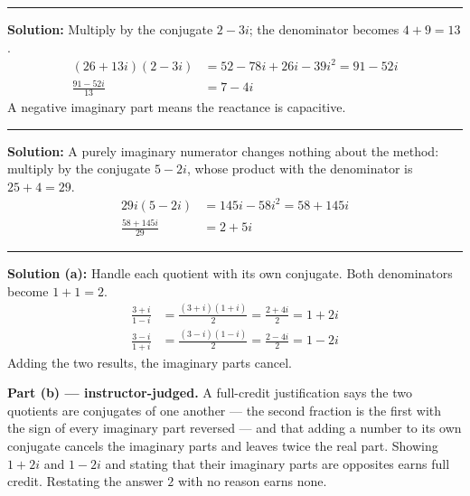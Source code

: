 \documentclass[12pt]{article}
\begin{document}
\vspace{0.15cm}
\noindent\rule{\linewidth}{0.2pt}


\textbf{Solution:} Multiply by the conjugate $2 - 3i$; the denominator becomes
$4 + 9 = 13$.
\begin{align*}
  (26 + 13i)(2 - 3i) &= 52 - 78i + 26i - 39i^2 = 91 - 52i \\
  \frac{91 - 52i}{13} &= 7 - 4i
\end{align*}
A negative imaginary part means the reactance is capacitive. 

\vspace{0.15cm}
\noindent\rule{\linewidth}{0.2pt}


\textbf{Solution:} A purely imaginary numerator changes nothing about the
method: multiply by the conjugate $5 - 2i$, whose product with the denominator
is $25 + 4 = 29$.
\begin{align*}
  29i(5 - 2i) &= 145i - 58i^2 = 58 + 145i \\
  \frac{58 + 145i}{29} &= 2 + 5i
\end{align*}

\vspace{0.15cm}
\noindent\rule{\linewidth}{0.2pt}


\textbf{Solution (a):} Handle each quotient with its own conjugate. Both
denominators become $1 + 1 = 2$.
\begin{align*}
  \frac{3 + i}{1 - i} &= \frac{(3 + i)(1 + i)}{2} = \frac{2 + 4i}{2} = 1 + 2i \\
  \frac{3 - i}{1 + i} &= \frac{(3 - i)(1 - i)}{2} = \frac{2 - 4i}{2} = 1 - 2i
\end{align*}
Adding the two results, the imaginary parts cancel. 

\textbf{Part (b) --- instructor-judged.} A full-credit justification says the
two quotients are conjugates of one another --- the second fraction is the first
with the sign of every imaginary part reversed --- and that adding a number to
its own conjugate cancels the imaginary parts and leaves twice the real part.
Showing $1 + 2i$ and $1 - 2i$ and stating that their imaginary parts are
opposites earns full credit. Restating the answer $2$ with no reason earns none.
\end{document}
